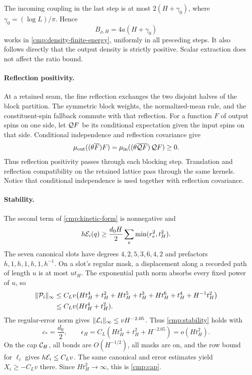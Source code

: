The incoming coupling in the last step is at most
\(2(H+\gamma_0)\), where \(\gamma_0=(\log L)/\pi\).  Hence
\[
 B_{\rho,H}=4a(H+\gamma_0)
\]
works in \eqref{cmp:density-finite-energy}, uniformly in all preceding
steps.  It also follows directly that the output density is strictly
positive.  Scalar extraction does not affect the ratio bound.

\paragraph{Reflection positivity.}
At a retained seam, the fine reflection exchanges the two disjoint
halves of the block partition.  The symmetric block weights, the
normalized-mean rule, and the constituent-spin fallback commute with
that reflection.  For a function \(F\) of output spins on one side,
let \({\cal Q}F\) be its conditional expectation given the input spins
on that side.  Conditional independence and reflection covariance give
\[
 \mu_{\rm out}((\theta\overline F)F)
   =\mu_{\rm in}
       ((\theta\overline{{\cal Q}F})\,{\cal Q}F)\ge0.
\]
Thus reflection positivity passes through each blocking step.
Translation and reflection compatibility on the retained lattice pass
through the same kernels.  Notice that conditional independence is
used together with reflection covariance.

\paragraph{Stability.}
The second term of \eqref{cmp:kinetic-form} is nonnegative and
\[
 h{\cal E}_i(q)\ge
           \frac{d_0H}{2}\sum_e\min(r_e^2,t_H^2).
\]
The seven canonical slots have degrees \(4,2,5,3,6,4,2\) and prefactors
\(h,1,h,1,h,1,h^{-1}\).  On a slot's regular mask, a displacement
along a recorded path of length \(u\) is at most \(ut_H\).
The exponential path norm absorbs every fixed power of \(u\), so
\begin{align*}
 \|{\cal P}_i\|_\infty
 &\le C_Lv\bigl(Ht_H^4+t_H^2+Ht_H^5+t_H^3
                         +Ht_H^6+t_H^4+H^{-1}t_H^2\bigr)\\
 &\le C_Lv(Ht_H^4+t_H^2).
\end{align*}
The regular-error norm gives
\(\|{\cal L}_i\|_\infty\le vH^{-2.05}\).  Thus
\eqref{cmp:stability} holds with
\[
 c_*=\frac{d_0}{2},\qquad
 \epsilon_H=C_L(Ht_H^4+t_H^2+H^{-2.05})=o(Ht_H^2).
\]
On the cap \({\cal C}_H\), all bonds are \(O(H^{-1/2})\), all masks
are on, and the row bound for \(\ell_i\) gives
\(h{\cal E}_i\le C_Lv\).  The same canonical and error estimates yield
\(X_i\ge-C_Lv\) there.  Since \(Ht_H^2\to\infty\), this is
\eqref{cmp:cap}.

